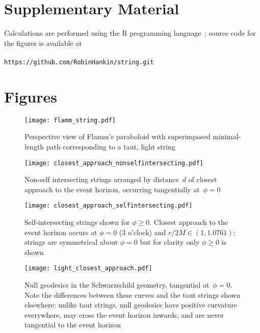 \documentclass[review]{elsarticle}
\begin{document}

\section*{Supplementary Material}

Calculations are performed using the R programming language~\cite{rcore2018};
source code for the figures is available at
\\
\\
{\tt https://github.com/RobinHankin/string.git}


\section*{Figures}

\begin{figure}[h!] %
\centering
\texttt{[image: flamm\_string.pdf]}
\caption{Perspective view of Flamm's paraboloid with superimposed minimal-length
  path corresponding to a taut, light string}
\label{flamm}
\end{figure}

\begin{figure}[p] %
\centering
\texttt{[image: closest\_approach\_nonselfintersecting.pdf]}
\caption{Non-self intersecting strings arranged by distance~$d$ of
  closest approach to the event horizon, occurring tangentially
  at~$\phi=0$}
\label{closest_approach_non_self_intersecting}
\end{figure}

\begin{figure}[p] %
\centering
\texttt{[image: closest\_approach\_selfintersecting.pdf]}
\caption{Self-intersecting strings shown for $\phi\geqslant 0$.  Closest
  approach to the event horizon occurs at $\phi=0$ (3 o'clock) and
  $r/2M\in\left(1,1.0761\right)$; strings are symmetrical about $\phi=0$
  but for clarity only $\phi\geqslant 0$ is shown}
\label{closest_approach_self_intersecting}
\end{figure}

\begin{figure}[p] %
\centering
\texttt{[image: light\_closest\_approach.pdf]}

\caption{Null geodesics in the Schwarzschild geometry, tangential
  at~$\phi=0$.  Note the differences between these curves and the taut
  strings shown elsewhere: unlike taut strings, null geodesics have
  positive curvature everywhere, may cross the event horizon inwards,
  and are never tangential to the event horizon}
\label{light_closest_approach}
\end{figure}
\end{document}
